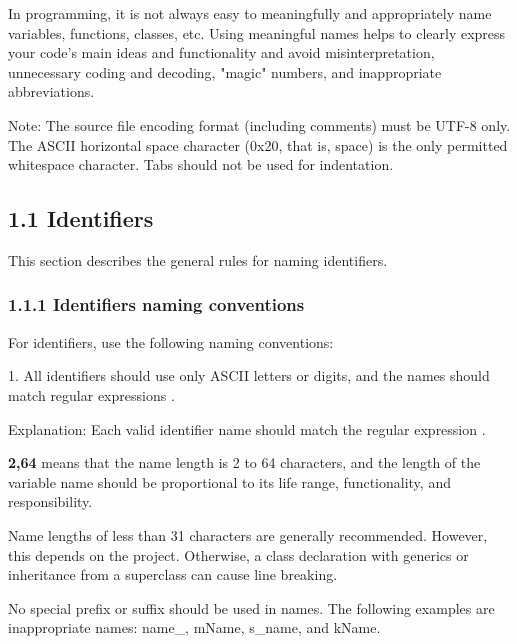 {{{{{{{{{{{{\label{sec:1.}

In programming, it is not always easy to meaningfully and appropriately name variables, functions, classes, etc. Using meaningful names helps to clearly express your code's main ideas and functionality and avoid misinterpretation, unnecessary coding and decoding, "magic" numbers, and inappropriate abbreviations.



Note: The source file encoding format (including comments) must be UTF-8 only. The ASCII horizontal space character (0x20, that is, space) is the only permitted whitespace character. Tabs should not be used for indentation.



\subsection*{\textbf{1.1 Identifiers}}

\label{sec:1.1}

This section describes the general rules for naming identifiers.

\subsubsection*{\textbf{1.1.1 Identifiers naming conventions}}
\leavevmode\newline

\label{sec:1.1.1}



For identifiers, use the following naming conventions:

1.	All identifiers should use only ASCII letters or digits, and the names should match regular expressions \textbf{}.

Explanation: Each valid identifier name should match the regular expression \textbf{}.

\textbf{{2,64}} means that the name length is 2 to 64 characters, and the length of the variable name should be proportional to its life range, functionality, and responsibility.

Name lengths of less than 31 characters are generally recommended. However, this depends on the project. Otherwise, a class declaration with generics or inheritance from a superclass can cause line breaking.

No special prefix or suffix should be used in names. The following examples are inappropriate names: name\_, mName, s\_name, and kName.



}}}}}}}}}}}}
